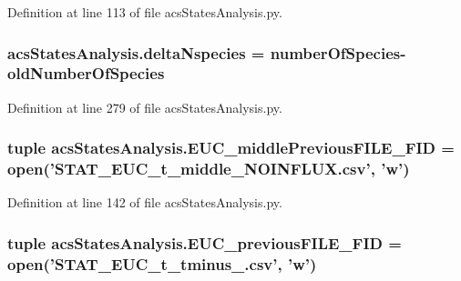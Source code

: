 Definition at line 113 of file acs\-States\-Analysis.\-py.

\hypertarget{a00098_a555117703c3245ec7d3d73f5d991c8c5}{
\subsubsection[{delta\-Nspecies}]{\setlength{\rightskip}{0pt plus 5cm}acs\-States\-Analysis.\-delta\-Nspecies = number\-Of\-Species-\/{\bf old\-Number\-Of\-Species}}}\label{a00098_a555117703c3245ec7d3d73f5d991c8c5}


Definition at line 279 of file acs\-States\-Analysis.\-py.

\hypertarget{a00098_afcb9ec3ed11cfcacae8f796af7605425}{
\subsubsection[{E\-U\-C\-\_\-middle\-Previous\-F\-I\-L\-E\-\_\-\-F\-I\-D}]{\setlength{\rightskip}{0pt plus 5cm}tuple acs\-States\-Analysis.\-E\-U\-C\-\_\-middle\-Previous\-F\-I\-L\-E\-\_\-\-F\-I\-D = open('S\-T\-A\-T\-\_\-\-E\-U\-C\-\_\-t\-\_\-middle\-\_\-\-N\-O\-I\-N\-F\-L\-U\-X.\-csv', 'w')}}\label{a00098_afcb9ec3ed11cfcacae8f796af7605425}


Definition at line 142 of file acs\-States\-Analysis.\-py.

\hypertarget{a00098_a3548edac9afffda077dcbd2876616b39}{
\subsubsection[{E\-U\-C\-\_\-previous\-F\-I\-L\-E\-\_\-\-F\-I\-D}]{\setlength{\rightskip}{0pt plus 5cm}tuple acs\-States\-Analysis.\-E\-U\-C\-\_\-previous\-F\-I\-L\-E\-\_\-\-F\-I\-D = open('S\-T\-A\-T\-\_\-\-E\-U\-C\-\_\-t\-\_\-tminus\-\_.\-csv', 'w')}}\label{a00098_a3548edac9afffda077dcbd2876616b39}


